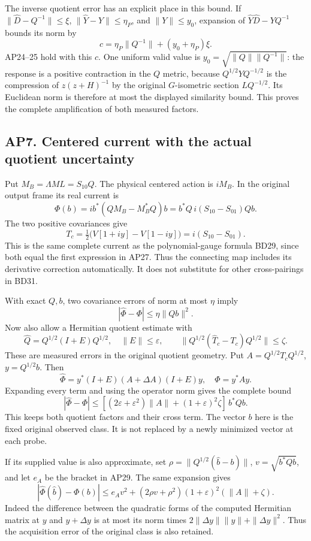 \documentclass[11pt]{article}
\begin{document}
The inverse quotient error has an explicit place in this bound. If \(\|\widehat D-Q^{-1}\|\le\xi\), \(\|\widehat Y-Y\|\le\eta_P\), and \(\|Y\|\le y_0\), expansion of \(\widehat Y\widehat D-YQ^{-1}\) bounds its norm by \[
 c=\eta_P\|Q^{-1}\|+(y_0+\eta_P)\xi. \tag{AP26a}
\] AP24--25 hold with this \(c\). One uniform valid value is \(y_0=\sqrt{\|Q\|\|Q^{-1}\|}\): the response is a positive contraction in the \(Q\) metric, because \(Q^{1/2}YQ^{-1/2}\) is the compression of \(z(z+H)^{-1}\) by the original \(G\)-isometric section \(LQ^{-1/2}\). Its Euclidean norm is therefore at most the displayed similarity bound. This proves the complete amplification of both measured factors.

\subsection{AP7. Centered current with the actual quotient uncertainty}\label{ap7.-centered-current-with-the-actual-quotient-uncertainty}

Put \(M_B=\Lambda ML=S_{10}Q\). The physical centered action is \(iM_B\). In the original output frame its real current is \[
 \Phi(b)=i b^*(QM_B-M_B^*Q)b
 =b^*Q\,i(S_{10}-S_{01})Qb. \tag{AP27}
\] The two positive covariances give \[
 T_c=\tfrac12\bigl(V[1+iy]-V[1-iy]\bigr)
 =i(S_{10}-S_{01}). \tag{AP28}
\] This is the same complete current as the polynomial-gauge formula BD29, since both equal the first expression in AP27. Thus the connecting map includes its derivative correction automatically. It does not substitute for other cross-pairings in BD31.

With exact \(Q,b\), two covariance errors of norm at most \(\eta\) imply \[
 |\widehat\Phi-\Phi|\le\eta\|Qb\|^2.
\] Now also allow a Hermitian quotient estimate with \[
 \widehat Q=Q^{1/2}(I+E)Q^{1/2},\quad\|E\|\le\varepsilon,
 \qquad \|Q^{1/2}(\widehat T_c-T_c)Q^{1/2}\|\le\zeta.
\] These are measured errors in the original quotient geometry. Put \(A=Q^{1/2}T_cQ^{1/2}\), \(y=Q^{1/2}b\). Then \[
 \widehat\Phi=y^*(I+E)(A+\Delta A)(I+E)y,\quad \Phi=y^*Ay.
\] Expanding every term and using the operator norm gives the complete bound \[
 |\widehat\Phi-\Phi|
 \le\left[(2\varepsilon+\varepsilon^2)\|A\|
 +(1+\varepsilon)^2\zeta\right]\,b^*Qb. \tag{AP29}
\] This keeps both quotient factors and their cross term. The vector \(b\) here is the fixed original observed class. It is not replaced by a newly minimized vector at each probe.

If its supplied value is also approximate, set \(\rho=\|Q^{1/2}(\widehat b-b)\|\), \(v=\sqrt{b^*Qb}\), and let \(e_A\) be the bracket in AP29. The same expansion gives \[
 |\widehat\Phi(\widehat b)-\Phi(b)|
 \le e_Av^2+(2\rho v+\rho^2)(1+\varepsilon)^2(\|A\|+\zeta).
 \tag{AP30}
\] Indeed the difference between the quadratic forms of the computed Hermitian matrix at \(y\) and \(y+\Delta y\) is at most its norm times \(2\|\Delta y\|\|y\|+\|\Delta y\|^2\). Thus the acquisition error of the original class is also retained.
\end{document}
